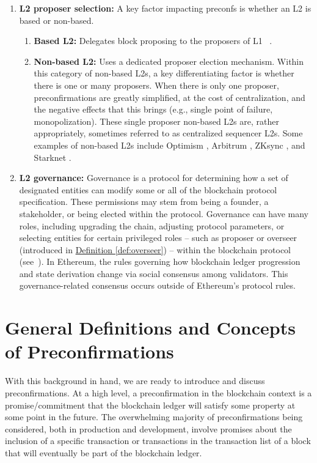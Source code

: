 \documentclass[a4paper]{article}
\theoremstyle{boldstyle}
\begin{document}
\begin{enumerate}
    \item \textbf{L2 proposer selection:} A key factor impacting preconfs is whether an L2 is based or non-based.
    \begin{enumerate}
        \item \textbf{Based L2:} Delegates block proposing to the proposers of L1 ~\cite{W:ExaminingtheBasedSequencingSpectrum,W:BasedrollupssuperpowersfromL1sequencing}. 
        \item \textbf{Non-based L2:} Uses a dedicated proposer election mechanism. Within this category of non-based L2s, a key differentiating factor is whether there is one or many proposers. When there is only one proposer, preconfirmations are greatly simplified, at the cost of centralization, and the negative effects that this brings (e.g., single point of failure, monopolization). These single proposer non-based L2s are, rather appropriately, sometimes referred to as centralized sequencer L2s.  Some examples of non-based L2s include Optimism \cite{Optimism}, Arbitrum \cite{Arbitrum}, ZKsync \cite{ZKsync}, and Starknet \cite{Starknet}.
    \end{enumerate}
    \item \textbf{L2 governance:}
    Governance is a protocol for determining how a set of designated entities can modify some or all of the blockchain protocol specification. These permissions may stem from being a founder, a stakeholder, or being elected within the protocol. Governance can have many roles, including upgrading the chain, adjusting protocol parameters, or selecting entities for certain privileged roles -- such as proposer or overseer (introduced in \hyperref[def:overseer]{Definition \ref{def:overseer}}) -- within the blockchain protocol (see~\cite{W:ThestateofArbitrumsprogressivedecentralization,W:Starknetstoken:STRK,W:GovernanceinSeason8:TheNextPhase}).     
    In Ethereum, the rules governing how blockchain ledger progression and state derivation change via social consensus among validators. This governance-related consensus occurs outside of Ethereum's protocol rules. 
\end{enumerate}


\section{General Definitions and Concepts of Preconfirmations}
\label{sec:definitions}
With this background in hand, we are ready to introduce and discuss preconfirmations. At a high level, a preconfirmation in the blockchain context is a promise/commitment that the blockchain ledger will satisfy some property at some point in the future. The overwhelming majority of preconfirmations being considered, both in production and development, involve promises about the inclusion of a specific transaction or transactions in the transaction list of a block that will eventually be part of the blockchain ledger.
\end{document}
